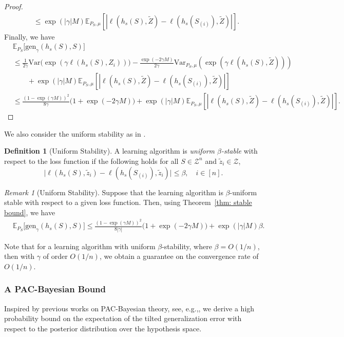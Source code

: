 \documentclass{article}
\theoremstyle{plain}
\theoremstyle{plain}
\theoremstyle{definition}
\newtheorem{definition}[theorem]{Definition}
\theoremstyle{remark}
\newtheorem{remark}[theorem]{Remark}
\newcommand{\var}{\mathrm{Var}}
\newcommand{\mbE}{\mathbb{E}}
\begin{document}
\begin{proof}
\[\begin{split}
    &\leq \exp(|\gamma|M)\mbE_{P_S,\mu}[|\ell(h_s(S),\tilde Z)-\ell(h_s(S_{(i)}),\tilde Z)|].
\end{split}\]
Finally, we have 
 \begin{equation*}
 \begin{split}
       &\mbE_{P_S}\big[ \mathrm{gen}_{\gamma}(h_s(S),S)\big]\\
       &\leq  \frac{1}{2\gamma}\var\big(\exp(\gamma\ell(h_s(S),Z_i))\big) -\frac{\exp(-2\gamma M)}{2\gamma}\var_{P_S,\mu}(\exp(\gamma\ell(h_s(S),\tilde{Z}))) \\&\qquad+\exp(|\gamma|M)\mbE_{P_S,\mu}[|\ell(h_s(S),\tilde Z)-\ell(h_s(S_{(i)}),\tilde Z)|]\\
       &\leq \frac{(1-\exp(\gamma M))^2}{8\gamma}\Big(1+\exp(-2\gamma M)\Big) +\exp(|\gamma|M)\mbE_{P_S,\mu}[|\ell(h_s(S),\tilde Z)-\ell(h_s(S_{(i)}),\tilde Z)|].
       \end{split}
        \end{equation*}
\end{proof}

 We also consider the uniform stability as in \cite{bousquet2002stability}. 
\begin{definition}[Uniform Stability]
    A learning algorithm is {\it uniform $\beta$-stable} with respect to the loss function if the following holds for all $S\in\mathcal{Z}^n$ and $\tilde{z}_i\in \mathcal{Z}$, 
    \[\big|\ell(h_s(S),\tilde{z}_i)-\ell(h_s(S_{(i)}),\tilde{z}_i)\big|\leq \beta, \quad i\in[n].\]
\end{definition}

\begin{remark}[Uniform Stability]
   Suppose that the learning algorithm is $\beta$-uniform stable with respect to a given loss function. Then, using Theorem~\ref{thm: stable bound}, we have 
   \begin{equation}
 \begin{split}
       &\mbE_{P_S}\big[ \mathrm{gen}_{\gamma}(h_s(S),S)\big]\leq  \frac{(1-\exp(\gamma M))^2}{8|\gamma|}\Big(1+\exp(-2\gamma M)\Big) +\exp(|\gamma|M)\beta.
       \end{split}
        \end{equation}
\end{remark}
Note that for a learning algorithm with uniform $\beta$-stability, where $\beta= O(1/n)$, then with $\gamma$ of order $O(1/n)$, we obtain a guarantee on the convergence rate of $O(1/n)$.
\subsubsection{A PAC-Bayesian Bound}\label{sec: pac}
Inspired by previous works on PAC-Bayesian theory, see, e.g.,\citep{alquier2021user,catoni2003pac}, we derive a high probability bound on the expectation of the tilted generalization error with respect to the posterior distribution over the hypothesis space. 
\end{document}
